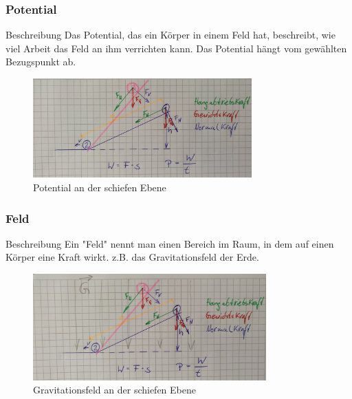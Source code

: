 \documentclass{article}
\begin{document}
\frame
{
  \frametitle{Potential}
\begin{block}{Beschreibung}
Das Potential, das ein Körper in einem Feld hat, beschreibt, wie viel Arbeit das Feld an ihm verrichten kann. Das Potential hängt vom gewählten Bezugspunkt ab.
\end{block}
      \begin{figure}
	  \includegraphics[width=0.75\textwidth]{Leistung}
	  \vspace{-3mm}
	  \caption{Potential an der schiefen Ebene}
   \end{figure}
}

\frame
{
  \frametitle{Feld}
\begin{block}{Beschreibung}
Ein "Feld" nennt man einen Bereich im Raum, in dem auf einen Körper eine Kraft wirkt. z.B. das Gravitationsfeld der Erde.
\end{block}
      \begin{figure}
	  \includegraphics[width=0.8\textwidth]{Feld}
	  \vspace{-3mm}
	  \caption{Gravitationsfeld an der schiefen Ebene}
   \end{figure}
}
\end{document}
